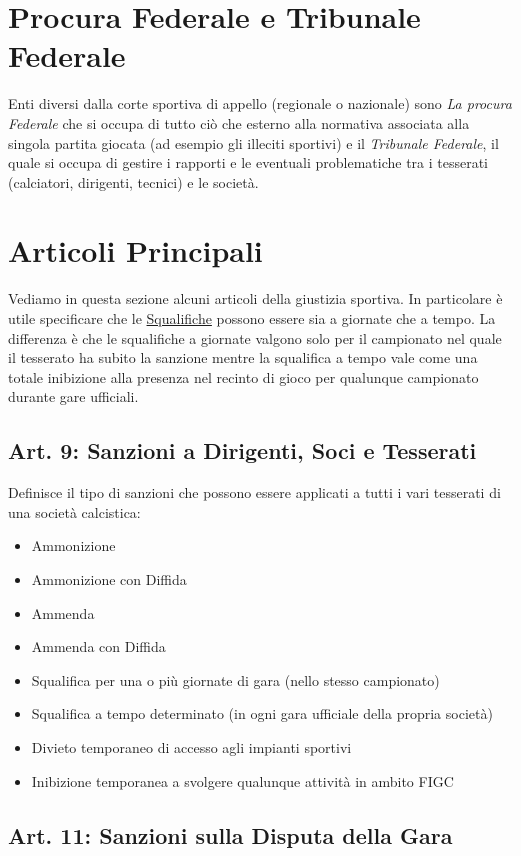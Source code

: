 \documentclass[../uefaC.tex]{subfiles}
\begin{document}
\section{Procura Federale e Tribunale Federale}
Enti diversi dalla corte sportiva di appello (regionale o nazionale) sono \emph{La procura Federale} che si occupa di tutto ciò che esterno alla normativa associata alla singola partita giocata (ad esempio gli illeciti sportivi) e il \emph{Tribunale Federale}, il quale si occupa di gestire i rapporti e le eventuali problematiche tra i tesserati (calciatori, dirigenti, tecnici) e le società.

\section{Articoli Principali}
Vediamo in questa sezione alcuni articoli della giustizia sportiva. In particolare è utile specificare che le \underline{Squalifiche} possono essere sia a giornate che a tempo. La differenza è che le squalifiche a giornate valgono solo per il campionato nel quale il tesserato ha subito la sanzione mentre la squalifica a tempo vale come una totale inibizione alla presenza nel recinto di gioco per qualunque campionato durante gare ufficiali.

\subsection{Art. 9: Sanzioni a Dirigenti, Soci e Tesserati}
Definisce il tipo di sanzioni che possono essere applicati a tutti i vari tesserati di una società calcistica:
\begin{itemize}
    \item Ammonizione
    \item Ammonizione con Diffida
    \item Ammenda
    \item Ammenda con Diffida
    \item Squalifica per una o più giornate di gara (nello stesso campionato)
    \item Squalifica a tempo determinato (in ogni gara ufficiale della propria società)
    \item Divieto temporaneo di accesso agli impianti sportivi
    \item Inibizione temporanea a svolgere qualunque attività in ambito FIGC
\end{itemize}
\subsection{Art. 11: Sanzioni sulla Disputa della Gara}
\end{document}
